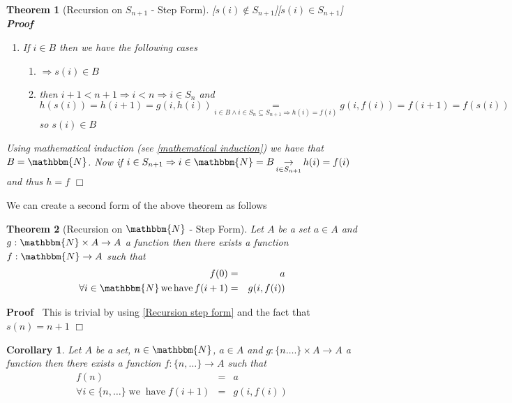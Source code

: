 \documentclass{book}
\newcommand{\Rightarrowlim}{\mathop{\rightarrow}\limits}
\newcommand{\equallim}{\mathop{=}\limits}
\newcommand{\nin}{\not\in}
\newcommand{\tmop}[1]{\ensuremath{\operatorname{#1}}}
\newcommand{\upl}{+}
\newenvironment{proof}{\noindent\textbf{Proof\ }}{\hspace*{\fill}$\Box$\medskip}
\newtheorem{corollary}{Corollary}
\newtheorem{theorem}{Theorem}
\begin{document}
{{\begin{theorem}[Recursion on $S_{n \upl 1}$ - Step Form][$s (i) \nin S_{n \upl
1}$][$s (i) \in S_{n \upl 1}$]
\begin{proof}
\begin{enumerate}
      \item If $i \in B$ then we have the following cases
      \begin{enumerate}
        \item $\Rightarrow s (i) \in B$
        
        \item then $i \upl 1 < n \upl 1 \Rightarrow i < n \Rightarrow i \in
        S_n$ and $h (s (i)) = h (i \upl 1) = g (i, h (i)) \equallim_{i \in B
        \wedge i \in S_n \subseteq S_{n \upl 1} \Rightarrow h (i) = f (i)} g
        (i, f (i)) = f (i \upl 1) = f (s (i))$ so $s (i) \in B$
      \end{enumerate}
    \end{enumerate}
    Using mathematical induction (see \ref{mathematical induction}) we have
    that $B =\mathbbm{N}$. Now if $i \in S_{n \upl 1} \Rightarrow i \in
    \mathbbm{N}= B \Rightarrowlim_{i \in S_{n + 1}} h (i) = f (i)$ and thus $h
    = f$
  \end{proof}
\end{theorem}

We can create a second form of the above theorem as follows

\begin{theorem}[Recursion on $\mathbbm{N}$ - Step Form]
  \label{recursion on N step form}Let $A$ be a set $a \in A$ and $g :
  \mathbbm{N} \times A \rightarrow A$ a function then there exists a function
  $f : \mathbbm{N} \rightarrow A$ such that
  \begin{eqnarray*}
    f (0) & = & a\\
    \forall i \in \mathbbm{N} \tmop{we} \tmop{have} f (i \upl 1) & = & g (i, f
    (i))
  \end{eqnarray*}
\end{theorem}

\begin{proof}
  This is trivial by using \ref{Recursion step form} and the fact that $s (n)
  = n + 1$ 
\end{proof}

\begin{corollary}
  \label{recursion on N step form (general)}Let $A$ be a set, $n \in
  \mathbbm{N}$, $a \in A$ and $g : \{ n \ldots . \} \times A \rightarrow A$ a
  function then there exists a function $f : \{ n, \ldots \} \rightarrow A$
  such that
  \begin{eqnarray*}
    f (n) & = & a\\
    \forall i \in \{ n, \ldots \} \tmop{we} \tmop{have} f (i + 1) & = & g (i,
    f (i))
  \end{eqnarray*}
\end{corollary}

}}
\end{document}

